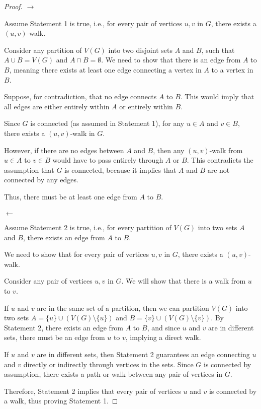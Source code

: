 \documentclass[12 pt]{article}
\begin{document}
\begin{proof}
    \textbf{$\rightarrow$}

Assume Statement 1 is true, i.e., for every pair of vertices \( u, v \) in \( G \), there exists a \((u,v)\)-walk.

Consider any partition of \( V(G) \) into two disjoint sets \( A \) and \( B \), such that \( A \cup B = V(G) \) and \( A \cap B = \emptyset \). We need to show that there is an edge from \( A \) to \( B \), meaning there exists at least one edge connecting a vertex in \( A \) to a vertex in \( B \).

Suppose, for contradiction, that no edge connects \( A \) to \( B \). This would imply that all edges are either entirely within \( A \) or entirely within \( B \). 

Since \( G \) is connected (as assumed in Statement 1), for any \( u \in A \) and \( v \in B \), there exists a \((u,v)\)-walk in \( G \). 

However, if there are no edges between \( A \) and \( B \), then any \((u,v)\)-walk from \( u \in A \) to \( v \in B \) would have to pass entirely through \( A \) or \( B \). This contradicts the assumption that \( G \) is connected, because it implies that \( A \) and \( B \) are not connected by any edges.

Thus, there must be at least one edge from \( A \) to \( B \). \\ \\ 

\textbf{$\leftarrow$}

Assume Statement 2 is true, i.e., for every partition of \( V(G) \) into two sets \( A \) and \( B \), there exists an edge from \( A \) to \( B \).

We need to show that for every pair of vertices \( u, v \) in \( G \), there exists a \((u,v)\)-walk.

Consider any pair of vertices \( u, v \) in \( G \). We will show that there is a walk from \( u \) to \( v \). 

If \( u \) and \( v \) are in the same set of a partition, then we can partition \( V(G) \) into two sets \( A = \{ u \} \cup (V(G) \setminus \{ u \}) \) and \( B = \{ v \} \cup (V(G) \setminus \{ v \}) \). By Statement 2, there exists an edge from \( A \) to \( B \), and since \( u \) and \( v \) are in different sets, there must be an edge from \( u \) to \( v \), implying a direct walk.

If \( u \) and \( v \) are in different sets, then Statement 2 guarantees an edge connecting \( u \) and \( v \) directly or indirectly through vertices in the sets. Since \( G \) is connected by assumption, there exists a path or walk between any pair of vertices in \( G \).

Therefore, Statement 2 implies that every pair of vertices \( u \) and \( v \) is connected by a walk, thus proving Statement 1.

\end{proof}
\end{document}
